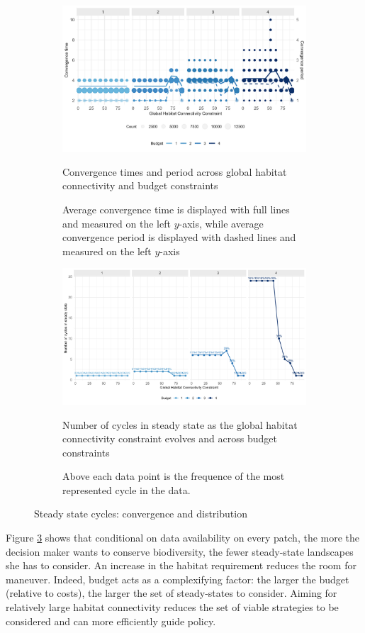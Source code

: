 \begin{figure}[h]
    \centering
    \begin{subfigure}[b]{\textwidth}
    \centering
    		\includegraphics[width = .8\textwidth]{figures/wildland/convergence_times.jpg}
    		\caption{Convergence times and period across global habitat connectivity and budget constraints}
    		\caption*{Average convergence time is displayed with full lines and measured on the left $y$-axis, while average convergence period is displayed with dashed lines and measured on the left $y$-axis} 
    		\label{fig:convergence_time}
	\end{subfigure}
	\begin{subfigure}[b]{\textwidth}
    		\centering
    		\includegraphics[width = .8\textwidth]{figures/wildland/number_of_cycles.jpg}
    		\caption{Number of cycles in steady state as the global habitat connectivity constraint evolves and across budget constraints}
    		\caption*{Above each data point is the frequence of the most represented cycle in the data.} 
    		\label{fig:distrib_cycles}
	\end{subfigure}
\caption{Steady state cycles: convergence and distribution}
\end{figure}
%
Figure \ref{fig:distrib_cycles} shows that conditional on data availability on every patch, the more the decision maker wants to conserve biodiversity, the fewer steady-state landscapes she has to consider. An increase in the habitat requirement reduces the room for maneuver. Indeed, budget acts as a complexifying factor: the larger the budget (relative to costs), the larger the set of steady-states to consider. 
Aiming for relatively large habitat connectivity reduces the set of viable strategies to be considered and can more efficiently guide policy. 
%


